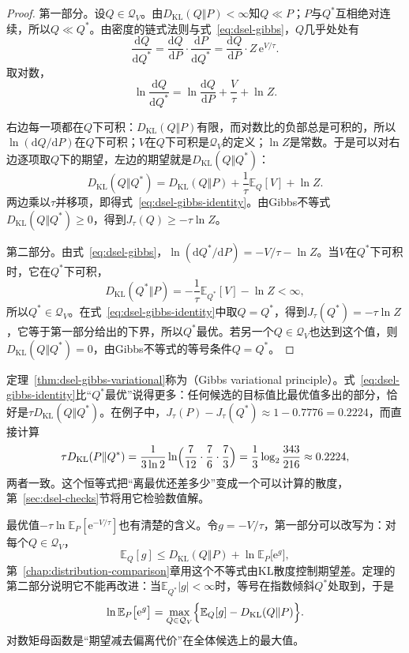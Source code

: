 \begin{proof}
第一部分。设$Q\in\mathcal{Q}_V$。由$D_{\mathrm{KL}}(Q\Vert P)<\infty$知$Q\ll P$；$P$与$Q^{*}$互相绝对连续，所以$Q\ll Q^{*}$。由密度的链式法则与式~\eqref{eq:dsel-gibbs}，$Q$几乎处处有
\[
 \frac{\mathrm{d}Q}{\mathrm{d}Q^{*}}=\frac{\mathrm{d}Q}{\mathrm{d}P}\cdot\frac{\mathrm{d}P}{\mathrm{d}Q^{*}}=\frac{\mathrm{d}Q}{\mathrm{d}P}\cdot Z\,\mathrm{e}^{V/\tau} .
\]
取对数，
\[
 \ln\frac{\mathrm{d}Q}{\mathrm{d}Q^{*}}=\ln\frac{\mathrm{d}Q}{\mathrm{d}P}+\frac{V}{\tau}+\ln Z .
\]

右边每一项都在$Q$下可积：$D_{\mathrm{KL}}(Q\Vert P)$有限，而对数比的负部总是可积的，所以$\ln(\mathrm{d}Q/\mathrm{d}P)$在$Q$下可积；$V$在$Q$下可积是$\mathcal{Q}_V$的定义；$\ln Z$是常数。于是可以对右边逐项取$Q$下的期望，左边的期望就是$D_{\mathrm{KL}}(Q\Vert Q^{*})$：
\[
 D_{\mathrm{KL}}(Q\Vert Q^{*})=D_{\mathrm{KL}}(Q\Vert P)+\frac{1}{\tau}\mathbb{E}_{Q}[V]+\ln Z .
\]
两边乘以$\tau$并移项，即得式~\eqref{eq:dsel-gibbs-identity}。由Gibbs不等式$D_{\mathrm{KL}}(Q\Vert Q^{*})\geq0$，得到$J_\tau(Q)\geq-\tau\ln Z$。

第二部分。由式~\eqref{eq:dsel-gibbs}，$\ln(\mathrm{d}Q^{*}/\mathrm{d}P)=-V/\tau-\ln Z$。当$V$在$Q^{*}$下可积时，它在$Q^{*}$下可积，
\[
 D_{\mathrm{KL}}(Q^{*}\Vert P)=-\frac1\tau\mathbb{E}_{Q^{*}}[V]-\ln Z<\infty ,
\]
所以$Q^{*}\in\mathcal{Q}_V$。在式~\eqref{eq:dsel-gibbs-identity}中取$Q=Q^{*}$，得到$J_\tau(Q^{*})=-\tau\ln Z$，它等于第一部分给出的下界，所以$Q^{*}$最优。若另一个$Q\in\mathcal{Q}_V$也达到这个值，则$D_{\mathrm{KL}}(Q\Vert Q^{*})=0$，由Gibbs不等式的等号条件$Q=Q^{*}$。
\end{proof}

定理~\ref{thm:dsel-gibbs-variational}称为（Gibbs variational principle）。式~\eqref{eq:dsel-gibbs-identity}比“$Q^{*}$最优”说得更多：任何候选的目标值比最优值多出的部分，恰好是$\tau D_{\mathrm{KL}}(Q\Vert Q^{*})$。在例子中，$J_\tau(P)-J_\tau(Q^{*})\approx1-0.7776=0.2224$，而直接计算
\[
 \tau D_{\mathrm{KL}}(P\Vert Q^{*})=\frac{1}{3\ln2}\ln\Bigl(\frac{7}{12}\cdot\frac76\cdot\frac73\Bigr)=\frac13\log_2\frac{343}{216}\approx0.2224 ,
\]
两者一致。这个恒等式把“离最优还差多少”变成一个可以计算的散度，第~\ref{sec:dsel-checks}节将用它检验数值解。

最优值$-\tau\ln\mathbb{E}_{P}[\mathrm{e}^{-V/\tau}]$也有清楚的含义。令$g=-V/\tau$，第一部分可以改写为：对每个$Q\in\mathcal{Q}_V$，
\begin{equation}
 \mathbb{E}_{Q}[g]\leq D_{\mathrm{KL}}(Q\Vert P)+\ln\mathbb{E}_{P}\bigl[\mathrm{e}^{g}\bigr] ,
 \label{eq:dsel-dv}
\end{equation}
第~\ref{chap:distribution-comparison}章用这个不等式由KL散度控制期望差。定理的第二部分说明它不能再改进：当$\mathbb{E}_{Q^{*}}\lvert g\rvert<\infty$时，等号在指数倾斜$Q^{*}$处取到，于是
\[
 \ln\mathbb{E}_{P}\bigl[\mathrm{e}^{g}\bigr]=\max_{Q\in\mathcal{Q}_V}\Bigl\{\mathbb{E}_{Q}[g]-D_{\mathrm{KL}}(Q\Vert P)\Bigr\} .
\]
对数矩母函数是“期望减去偏离代价”在全体候选上的最大值。

